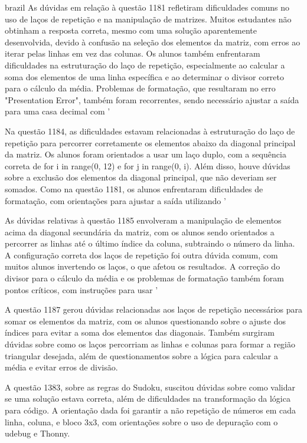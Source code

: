 \begin{otherlanguage*}{brazil}
As dúvidas em relação à questão 1181 refletiram dificuldades comuns no uso de laços de repetição e na manipulação de matrizes. Muitos estudantes não obtinham a resposta correta, mesmo com uma solução aparentemente desenvolvida, devido à confusão na seleção dos elementos da matriz, com erros ao iterar pelas linhas em vez das colunas. Os alunos também enfrentaram dificuldades na estruturação do laço de repetição, especialmente ao calcular a soma dos elementos de uma linha específica e ao determinar o divisor correto para o cálculo da média. Problemas de formatação, que resultaram no erro "Presentation Error", também foram recorrentes, sendo necessário ajustar a saída para uma casa decimal com '%

Na questão 1184, as dificuldades estavam relacionadas à estruturação do laço de repetição para percorrer corretamente os elementos abaixo da diagonal principal da matriz. Os alunos foram orientados a usar um laço duplo, com a sequência correta de for i in range(0, 12) e for j in range(0, i). Além disso, houve dúvidas sobre a exclusão dos elementos da diagonal principal, que não deveriam ser somados. Como na questão 1181, os alunos enfrentaram dificuldades de formatação, com orientações para ajustar a saída utilizando '%

As dúvidas relativas à questão 1185 envolveram a manipulação de elementos acima da diagonal secundária da matriz, com os alunos sendo orientados a percorrer as linhas até o último índice da coluna, subtraindo o número da linha. A configuração correta dos laços de repetição foi outra dúvida comum, com muitos alunos invertendo os laços, o que afetou os resultados. A correção do divisor para o cálculo da média e os problemas de formatação também foram pontos críticos, com instruções para usar '%

A questão 1187 gerou dúvidas relacionadas aos laços de repetição necessários para somar os elementos da matriz, com os alunos questionando sobre o ajuste dos índices para evitar a soma dos elementos das diagonais. Também surgiram dúvidas sobre como os laços percorriam as linhas e colunas para formar a região triangular desejada, além de questionamentos sobre a lógica para calcular a média e evitar erros de divisão.

A questão 1383, sobre as regras do Sudoku, suscitou dúvidas sobre como validar se uma solução estava correta, além de dificuldades na transformação da lógica para código. A orientação dada foi garantir a não repetição de números em cada linha, coluna, e bloco 3x3, com orientações sobre o uso de depuração com o udebug e Thonny.


\end{otherlanguage*}
